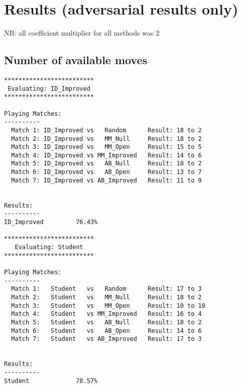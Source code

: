 \documentclass[11pt]{article}
\begin{document}

\section{Results (adversarial results only)}
NB: all coefficient multiplier for all methods was 2
\subsection{Number of available moves}
\begin{verbatim}
*************************
 Evaluating: ID_Improved 
*************************

Playing Matches:
----------
  Match 1: ID_Improved vs   Random    	Result: 18 to 2
  Match 2: ID_Improved vs   MM_Null   	Result: 18 to 2
  Match 3: ID_Improved vs   MM_Open   	Result: 15 to 5
  Match 4: ID_Improved vs MM_Improved 	Result: 14 to 6
  Match 5: ID_Improved vs   AB_Null   	Result: 18 to 2
  Match 6: ID_Improved vs   AB_Open   	Result: 13 to 7
  Match 7: ID_Improved vs AB_Improved 	Result: 11 to 9


Results:
----------
ID_Improved         76.43%

*************************
   Evaluating: Student   
*************************

Playing Matches:
----------
  Match 1:   Student   vs   Random    	Result: 17 to 3
  Match 2:   Student   vs   MM_Null   	Result: 18 to 2
  Match 3:   Student   vs   MM_Open   	Result: 10 to 10
  Match 4:   Student   vs MM_Improved 	Result: 16 to 4
  Match 5:   Student   vs   AB_Null   	Result: 18 to 2
  Match 6:   Student   vs   AB_Open   	Result: 14 to 6
  Match 7:   Student   vs AB_Improved 	Result: 17 to 3


Results:
----------
Student             78.57%

\end{verbatim}
\end{document}
